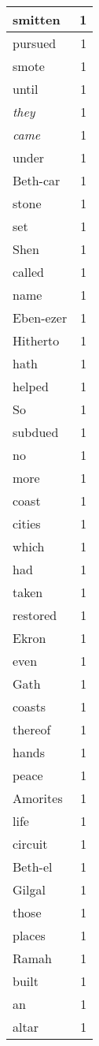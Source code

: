 \begin{center}
\begin{longtable}{l|r}
smitten & 1 \\ \hline
pursued & 1 \\ \hline
smote & 1 \\ \hline
until & 1 \\ \hline
\emph{they} & 1 \\ \hline
\emph{came} & 1 \\ \hline
under & 1 \\ \hline
Beth-car & 1 \\ \hline
stone & 1 \\ \hline
set & 1 \\ \hline
Shen & 1 \\ \hline
called & 1 \\ \hline
name & 1 \\ \hline
Eben-ezer & 1 \\ \hline
Hitherto & 1 \\ \hline
hath & 1 \\ \hline
helped & 1 \\ \hline
So & 1 \\ \hline
subdued & 1 \\ \hline
no & 1 \\ \hline
more & 1 \\ \hline
coast & 1 \\ \hline
cities & 1 \\ \hline
which & 1 \\ \hline
had & 1 \\ \hline
taken & 1 \\ \hline
restored & 1 \\ \hline
Ekron & 1 \\ \hline
even & 1 \\ \hline
Gath & 1 \\ \hline
coasts & 1 \\ \hline
thereof & 1 \\ \hline
hands & 1 \\ \hline
peace & 1 \\ \hline
Amorites & 1 \\ \hline
life & 1 \\ \hline
circuit & 1 \\ \hline
Beth-el & 1 \\ \hline
Gilgal & 1 \\ \hline
those & 1 \\ \hline
places & 1 \\ \hline
Ramah & 1 \\ \hline
built & 1 \\ \hline
an & 1 \\ \hline
altar & 1 \\ \hline
\end{longtable}
\end{center}



